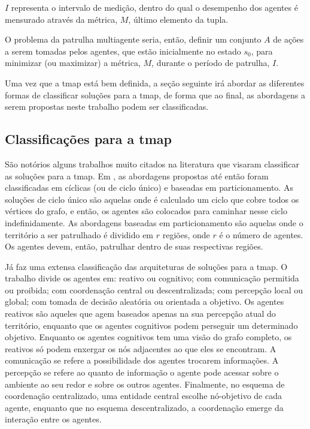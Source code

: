 $I$ representa o intervalo de medição, dentro do qual o desempenho dos agentes 
é mensurado através da métrica, $M$, último elemento da 
tupla.

O problema da patrulha multiagente seria, então, definir um conjunto $A$ de 
ações a serem tomadas pelos agentes, que estão inicialmente no estado $s_{0}$, 
para minimizar (ou maximizar) a métrica, $M$, durante o período de patrulha, 
$I$.

Uma vez que a \ac{tmap} está bem definida, a seção seguinte irá abordar as 
diferentes formas de classificar soluções para a \ac{tmap}, de forma que ao 
final, as abordagens a serem propostas neste trabalho podem ser classificadas.

\subsection{Classificações para a \ac{tmap}}
\label{sec:classifytmap}

São notórios alguns trabalhos muito citados na literatura que visaram 
classificar as soluções para a \ac{tmap}. Em 
\citep{Chevaleyre:2004:TAM:1018411.1019013}, as abordagens propostas até 
então foram classificadas em cíclicas (ou de ciclo único) e 
baseadas em particionamento. As soluções de ciclo único são aquelas onde é 
calculado um ciclo que cobre todos os vértices do grafo, e então, os agentes são 
colocados para caminhar nesse ciclo indefinidamente. As abordagens baseadas em 
particionamento são aquelas onde o território a ser patrulhado é dividido em 
$r$ regiões, onde $r$ é o número de agentes. Os agentes devem, então, patrulhar 
dentro de suas respectivas regiões.

Já \citep{Machado:2002:MPE:1765317.1765332} faz uma extensa classificação das 
arquiteturas de soluções para a \ac{tmap}. O trabalho divide os agentes em: 
reativo ou cognitivo; com comunicação permitida ou 
proibida; com coordenação central ou descentralizada; com 
percepção local ou global; com tomada de decisão 
aleatória ou orientada a objetivo. Os agentes reativos são aqueles que 
agem baseados apenas na sua percepção atual do território, enquanto que os 
agentes cognitivos podem perseguir um determinado objetivo. Enquanto os agentes 
cognitivos tem uma visão do grafo completo, os reativos só podem enxergar os nós 
adjacentes ao que eles se encontram. A comunicação se refere a possibilidade dos 
agentes trocarem informações. A percepção se refere ao quanto de informação o 
agente pode acessar sobre o ambiente ao seu redor e sobre os outros agentes. 
Finalmente, no esquema de coordenação centralizado, uma entidade central escolhe 
nó-objetivo de cada agente, enquanto que no esquema descentralizado, a 
coordenação emerge da interação entre os agentes.

